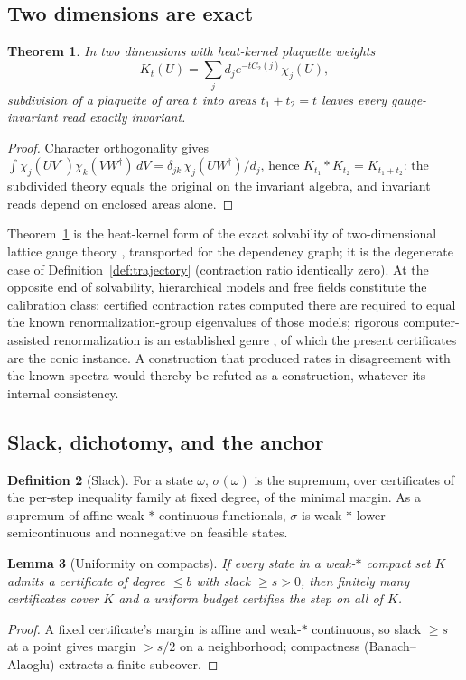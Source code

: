\documentclass[11pt]{article}
\newtheorem{theorem}{Theorem}[section]
\newtheorem{lemma}[theorem]{Lemma}
\theoremstyle{definition}
\newtheorem{definition}[theorem]{Definition}
\theoremstyle{remark}
\begin{document}
\subsection{Two dimensions are exact}
\begin{theorem}\label{thm:2d}
In two dimensions with heat-kernel plaquette weights
\[
K_t(U) = \sum_j d_j e^{-t C_2(j)} \chi_j(U),
\]
subdivision of a plaquette of area $t$
into areas $t_1 + t_2 = t$ leaves every gauge-invariant read exactly
invariant.
\end{theorem}
\begin{proof}
Character orthogonality gives $\int \chi_j(UV^\dagger)\chi_k(VW^\dagger)
\,dV = \delta_{jk}\,\chi_j(UW^\dagger)/d_j$, hence $K_{t_1} * K_{t_2} =
K_{t_1+t_2}$: the subdivided theory equals the original on the invariant
algebra, and invariant reads depend on enclosed areas alone.
\end{proof}

\noindent Theorem~\ref{thm:2d} is the heat-kernel form of the exact
solvability of two-dimensional lattice gauge theory \cite{migdal},
transported for the dependency graph; it is the degenerate case of
Definition~\ref{def:trajectory} (contraction ratio identically zero).
At the opposite end of solvability, hierarchical models and free fields
constitute the calibration class: certified contraction rates computed
there are required to equal the known renormalization-group eigenvalues
of those models; rigorous computer-assisted renormalization is an
established genre \cite{lanford,koch}, of which the present certificates
are the conic instance.  A construction that produced rates in
disagreement with the known spectra would thereby be refuted as a
construction, whatever its internal consistency.

\subsection{Slack, dichotomy, and the anchor}
\begin{definition}[Slack]\label{def:slack}
For a state $\omega$, $\sigma(\omega)$ is the supremum, over certificates
of the per-step inequality family at fixed degree, of the minimal margin.
As a supremum of affine weak-$*$ continuous functionals, $\sigma$ is
weak-$*$ lower semicontinuous and nonnegative on feasible states.
\end{definition}

\begin{lemma}[Uniformity on compacts]\label{lem:uniformity}
If every state in a weak-$*$ compact set $K$ admits a certificate of
degree $\le b$ with slack $\ge s > 0$, then finitely many certificates
cover $K$ and a uniform budget certifies the step on all of $K$.
\end{lemma}
\begin{proof}
A fixed certificate's margin is affine and weak-$*$ continuous, so slack
$\ge s$ at a point gives margin $> s/2$ on a neighborhood; compactness
(Banach--Alaoglu) extracts a finite subcover.
\end{proof}
\end{document}
